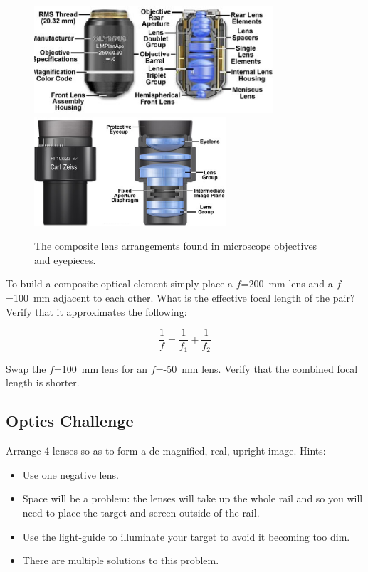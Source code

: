 \documentclass[a4paper]{report}
\begin{document}
\begin{figure}[h]
\center
\includegraphics[width=3.5in]{objectivesfigure1.eps}
\includegraphics[width=2.8in]{eyepieces5.eps}
\caption{The composite lens arrangements found in microscope
  objectives and eyepieces.}
\label{composite}
\end{figure}

To build a composite optical element simply place a $f$=200~mm lens and a $f$=100~mm adjacent to each other. 
What is the effective focal length of the pair? Verify that it approximates the following:

\begin{equation}
\frac{1}{f}=\frac{1}{f_1}+\frac{1}{f_2}
\label{eq:beamFocalLength}
\end{equation}

\noindent
Swap the $f$=100~mm lens for an $f$=-50~mm lens. Verify that the
combined focal length is shorter.

\subsection{Optics Challenge}
Arrange 4 lenses so as to form a de-magnified, real, upright
image. Hints: 
\begin{itemize}
\item Use one negative lens.
\item Space will be a problem: the lenses will take up the whole rail
  and so you will need to place the target and screen outside of the
  rail. 
\item Use the light-guide to illuminate your target to avoid it
  becoming too dim. 
\item There are multiple solutions to this problem.
\end{itemize}
\end{document}
